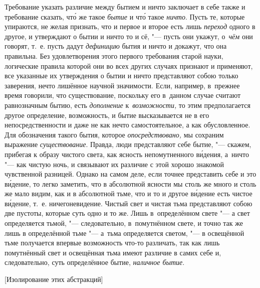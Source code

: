 Требование указать различие между бытием и ничто заключает в себе также и
требование сказать, чт\'{о} же такое {\em бытие} и чт\'{о} такое {\em ничто}.
Пусть те, которые упираются, не желая признать, что и первое и второе есть лишь
{\em переход} одного в другое, и утверждают о бытии и ничто то и сё, "--- пусть
они укажут, о~{\em чём} они говорят, т.~е. пусть дадут {\em дефиницию} бытия и
ничто и докажут, что она правильна. Без удовлетворения этого первого требования
старой науки, логические правила которой они во всех других случаях признают и
применяют, все указанные их утверждения о бытии и ничто представляют собою
только заверения, нечто лишённое научной значимости. Если, например, в~прежнее
время говорили, что существование, поскольку его в~данном случае считают
равнозначным бытию, есть {\em дополнение} к~{\em возможности,} то этим
предполагается другое определение, возможность, и бытие высказывается не в его
непосредственности и даже не как нечто самостоятельное, а как обусловленное.
Для обозначения такого бытия, которое {\em опосредствовано,} мы сохраним
выражение {\em существование}. Правда, люди представляют себе бытие, "---
скажем, прибегая к образу чистого света, как ясность непомутненного
в\'{и}дения, а~ничто "--- как чистую ночь, и связывают их различие с этой
хорошо знакомой чувственной разницей. Однако на самом деле, если точнее
представить себе и это в\'{и}дение, то легко заметить, что в абсолютной ясности
мы столь же много и столь же мало видим, как и в абсолютной тьме, что и то и
другое в\'{и}дение есть чистое в\'{и}дение, т.~е. ничегоневидение. Чистый свет
и чистая тьма представляют собою две пустоты, которые суть одно и то же. Лишь
в~определённом свете "--- а свет определяется тьмой, "--- следовательно,
в~помутнённом свете, и точно так же лишь в определённой тьме "--- а~тьма
определяется светом, "--- в освещённой тьме получается впервые возможность
что-то различать, так как лишь помутнённый свет и освещённая тьма имеют
различие в самих себе и, следовательно, суть определённое бытие,
{\em наличное бытие}.

%
{[Изолирование этих абстракций]}

